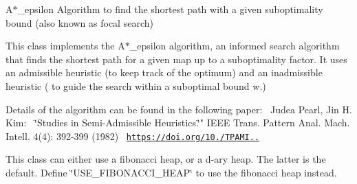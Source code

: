 A$\ast$\+\_\+epsilon Algorithm to find the shortest path with a given suboptimality bound (also known as focal search) 

This class implements the A$\ast$\+\_\+epsilon algorithm, an informed search algorithm that finds the shortest path for a given map up to a suboptimality factor. It uses an admissible heuristic (to keep track of the optimum) and an inadmissible heuristic ( to guide the search within a suboptimal bound w.)

Details of the algorithm can be found in the following paper\+:~\newline
Judea Pearl, Jin H. Kim\+:~\newline
\char`\"{}\+Studies in Semi-\/\+Admissible Heuristics.\char`\"{}" I\+E\+EE Trans. Pattern Anal. Mach. Intell. 4(4)\+: 392-\/399 (1982)~\newline
\href{https://doi.org/10.1109/TPAMI.1982.4767270}{\tt https\+://doi.\+org/10./\+T\+P\+A\+M\+I..}

This class can either use a fibonacci heap, or a d-\/ary heap. The latter is the default. Define \char`\"{}\+U\+S\+E\+\_\+\+F\+I\+B\+O\+N\+A\+C\+C\+I\+\_\+\+H\+E\+A\+P\char`\"{} to use the fibonacci heap instead.


